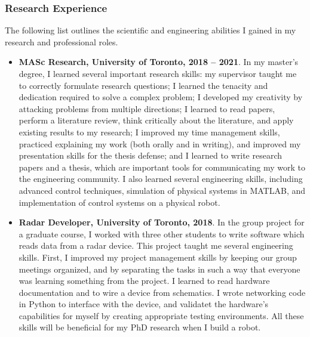 \documentclass[a4paper,12pt]{article}
\begin{document}
\subsubsection*{Research Experience}
The following list outlines the scientific and engineering abilities I gained in
my research and professional roles.
\begin{itemize}
    \item \textbf{MASc Research, University of Toronto, 2018 -- 2021}.
        In my master's degree, I learned several important research skills:
        my supervisor taught me to correctly formulate research questions;
        I learned the tenacity and dedication required to solve a
        complex problem; I developed my creativity by attacking problems from
        multiple directions; I learned to read papers, perform a literature
        review, think critically about the literature, and apply existing
        results to my research; I improved my time management skills, practiced
        explaining my work (both orally and in writing), and improved my
        presentation skills for the thesis defense; and I learned to write
        research papers and a thesis, which are important tools for communicating my
        work to the engineering community.
        I also learned several engineering skills, including advanced control
        techniques, simulation of physical systems in MATLAB, and implementation
        of control systems on a physical robot.

    \item \textbf{Radar Developer, University of Toronto, 2018}.
        In the group project for a graduate course, I worked with three other
        students to write software which reads data from a radar device.
        This project taught me several engineering skills.
        First, I improved my project management skills by keeping our group
        meetings organized, and by separating the tasks in such a way
        that everyone was learning something from the project.
        I learned to read hardware documentation and to wire a device from
        schematics.
        I wrote networking code in Python to interface with the
        device, and validatet the hardware's capabilities for myself by
        creating appropriate testing environments. 
        All these skills will be beneficial for my PhD research when I build a
        robot.


\end{itemize}
\end{document}
